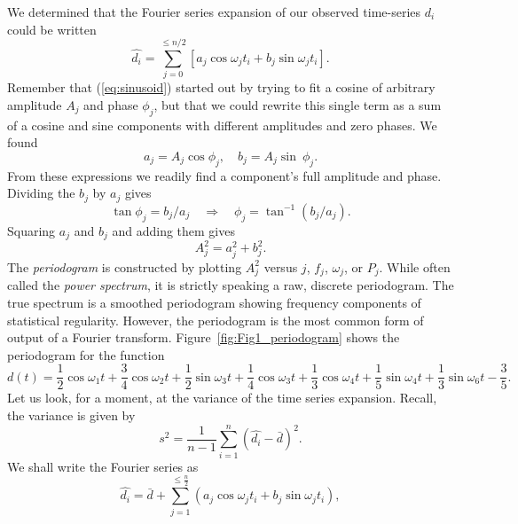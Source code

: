 	We determined that the Fourier series expansion of our observed time-series $d_i$ could be 
written
\begin{equation}
\hat{d_i} = \sum^{\leq n/2}_{j=0} [ a_j \cos \omega_j t_i + b_j \sin \omega_j t_i ].
\end{equation}
Remember that (\ref{eq:sinusoid}) started out by trying to fit a cosine of arbitrary amplitude $A_j$ and phase $\phi_j$, 
but that we could rewrite this single term as a sum of a cosine and sine components with different amplitudes 
and zero phases.  We found
\begin{equation}
a_j = A_j \cos \phi_j, \quad b_j = A_j \sin \ \phi_j.
\end{equation}
From these expressions we readily find a component's full amplitude and phase.  Dividing the 
$b_j$ by $a_j$ gives 
\begin{equation}
\tan \phi_j = b_j / a_j \quad \Rightarrow \quad \phi _j = \tan ^{-1} (b_j / a_j).
\end{equation}
Squaring $a_j$ and $b_j$ and adding them gives
\begin{equation}
A^2_j = a^2_j + b^2_j.
\end{equation}
The \emph{periodogram} is constructed by plotting $A_j^2$ versus $j$, $f_j$, $\omega_j$, or $P_j$.  While often called the 
\emph{power spectrum}, it is strictly speaking a raw, discrete periodogram.  The true spectrum is a 
smoothed periodogram showing frequency components of statistical regularity.  However, the 
periodogram is the most common form of output of a Fourier transform.  Figure~\ref{fig:Fig1_periodogram}
shows the periodogram for the function
\begin{equation}
d(t) = \frac{1}{2} \cos \omega_1 t + \frac{3}{4} \cos \omega_2 t + \frac{1}{2} \sin \omega_3 t
	+ \frac{1}{4} \cos \omega_3 t + \frac{1}{3} \cos \omega_4 t + \frac{1}{5} \sin \omega_4 t + \frac{1}{3} \sin \omega_6 t - \frac{3}{5}.
\label{eq:periodogram}
\end{equation}
Let us look, for a moment, at the variance of the time series expansion.  Recall, the variance is 
given by
\begin{equation}
s^2 = \frac{1}{n-1} \sum^n _{i=1} (\hat{d_i} - \bar{d}) ^2.
\end{equation}
We shall write the Fourier series as
\begin{equation}
\hat{d_i} = \bar{d} + \sum_{j=1} ^{\leq \frac{n}{2}} \left (a_j \cos \omega _j t_i + b_j \sin \omega_j t_i \right ),
\end{equation}
